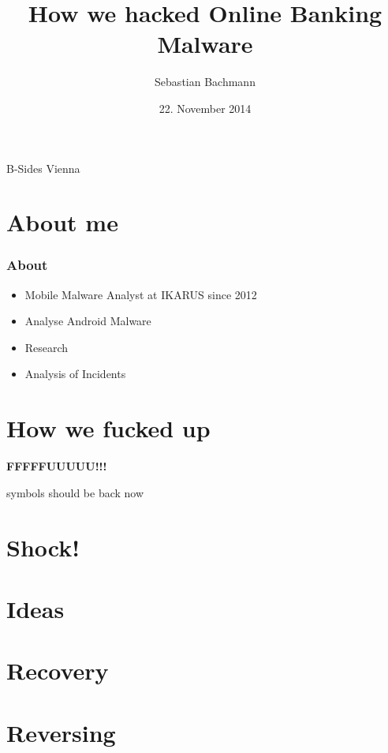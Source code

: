 \documentclass[12pt,a4paper]{beamer}
\author{Sebastian Bachmann}
\title{How we hacked Online Banking Malware}
\date{22. November 2014}
\newcommand{\mybox}[1]{\par\noindent\colorbox{shadecolor}
{\color{textcolor}\parbox{\dimexpr\textwidth-2\fboxsep\relax}{\fontsize{3em}{3.5em}\selectfont\textbf{{#1}}}}}
\begin{document}
\begin{frame}
    \maketitle
    \centering
    B-Sides Vienna
\end{frame}


\section{About me}
\begin{frame}
	\frametitle{About}
	\begin{itemize}
		\item Mobile Malware Analyst at IKARUS since 2012
		\item Analyse Android Malware
		\item Research
		\item Analysis of Incidents
	\end{itemize}
\end{frame}


\section{How we fucked up}
{
\begin{frame}[plain]
\mybox{FFFFFUUUUU!!!}
\end{frame}
}

\begin{frame}
    symbols should be back now
\end{frame}


\section{Shock!}

\section{Ideas}

\section{Recovery}

\section{Reversing}
\end{document}
